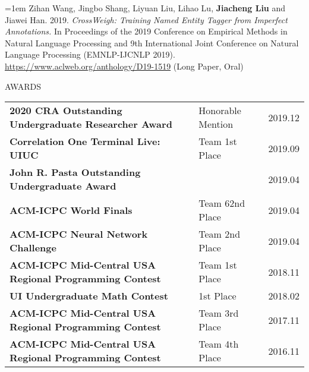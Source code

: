 \documentclass[10pt]{article}
\begin{document}
\hangindent=1em
Zihan Wang, Jingbo Shang, Liyuan Liu, Lihao Lu, \textbf{Jiacheng Liu} and Jiawei Han. 2019. \emph{CrossWeigh: Training Named Entity Tagger from Imperfect Annotations.} In Proceedings of the 2019 Conference on Empirical Methods in Natural Language Processing and 9th International Joint Conference on Natural Language Processing (EMNLP-IJCNLP 2019). \href{https://www.aclweb.org/anthology/D19-1519}{https://www.aclweb.org/anthology/D19-1519} (Long Paper, Oral)

\vspace{1em}
{\LARGE AWARDS}

\begin{tabularx}{\textwidth}{X l r}
\textbf{2020 CRA Outstanding Undergraduate Researcher Award} & Honorable Mention & 2019.12 \\
\textbf{Correlation One Terminal Live: UIUC} & Team 1st Place & 2019.09 \\
\textbf{John R. Pasta Outstanding Undergraduate Award} & & 2019.04 \\
\textbf{ACM-ICPC World Finals} & Team 62nd Place & 2019.04 \\
\textbf{ACM-ICPC Neural Network Challenge} & Team 2nd Place & 2019.04 \\
\textbf{ACM-ICPC Mid-Central USA Regional Programming Contest} & Team 1st Place & 2018.11 \\
\textbf{UI Undergraduate Math Contest} & 1st Place & 2018.02 \\
\textbf{ACM-ICPC Mid-Central USA Regional Programming Contest} & Team 3rd Place & 2017.11 \\
\textbf{ACM-ICPC Mid-Central USA Regional Programming Contest} & Team 4th Place & 2016.11
\end{tabularx}
\end{document}
